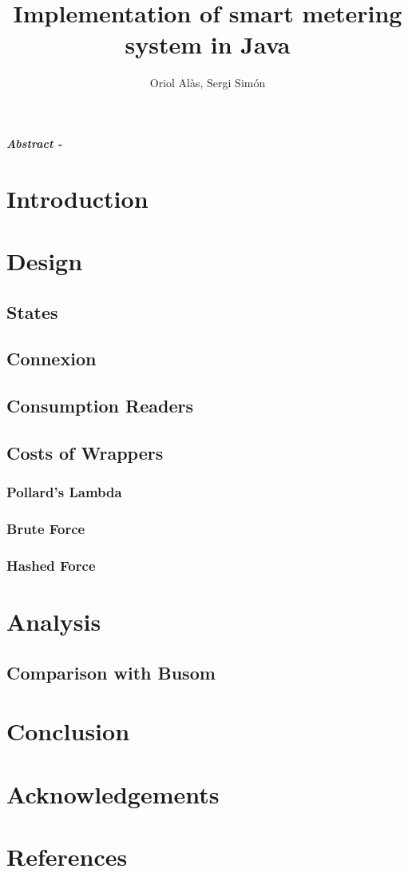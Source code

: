 \documentclass{article}
\title{Implementation of smart metering system in Java}
\author{Oriol Alàs, Sergi Simón}
\begin{document}
   \maketitle
   
   \textbf{\textit{Abstract - }}
   \section{Introduction}
   
   \section{Design}
   \subsection{States}
   \subsection{Connexion}
   \subsection{Consumption Readers}
   \subsection{Costs of Wrappers}
   \subsubsection{Pollard's Lambda}
   \subsubsection{Brute Force}
   \subsubsection{Hashed Force}
   \section{Analysis}
    
   \subsection{Comparison with Busom}
   
   \section{Conclusion}
   \section{Acknowledgements}
   \section{References}
\end{document}
